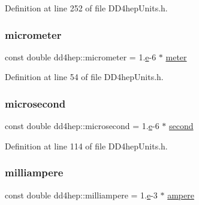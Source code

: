 Definition at line 252 of file D\+D4hep\+Units.\+h.

\hypertarget{namespacedd4hep_ae1c0791e549db4ff640f02a54c2e4e11}{}\label{namespacedd4hep_ae1c0791e549db4ff640f02a54c2e4e11} 
\subsubsection{\texorpdfstring{micrometer}{micrometer}}
{\footnotesize\ttfamily const double dd4hep\+::micrometer = 1.\hyperlink{_volumes_8cpp_a8a9a1f93e9b09afccaec215310e64142}{e}-\/6 $\ast$ \hyperlink{namespacedd4hep_a46f5cf0231796af4296a307a58812b06}{meter}\hspace{0.3cm}{\ttfamily [static]}}



Definition at line 54 of file D\+D4hep\+Units.\+h.

\hypertarget{namespacedd4hep_a82330b93e44ff2e4bc64471f4fb3387d}{}\label{namespacedd4hep_a82330b93e44ff2e4bc64471f4fb3387d} 
\subsubsection{\texorpdfstring{microsecond}{microsecond}}
{\footnotesize\ttfamily const double dd4hep\+::microsecond = 1.\hyperlink{_volumes_8cpp_a8a9a1f93e9b09afccaec215310e64142}{e}-\/6 $\ast$ \hyperlink{namespacedd4hep_ac03364576705a245265d8ed6ea26b871}{second}\hspace{0.3cm}{\ttfamily [static]}}



Definition at line 114 of file D\+D4hep\+Units.\+h.

\hypertarget{namespacedd4hep_a0df135e4eeb5cd94ace403e633d0c4af}{}\label{namespacedd4hep_a0df135e4eeb5cd94ace403e633d0c4af} 
\subsubsection{\texorpdfstring{milliampere}{milliampere}}
{\footnotesize\ttfamily const double dd4hep\+::milliampere = 1.\hyperlink{_volumes_8cpp_a8a9a1f93e9b09afccaec215310e64142}{e}-\/3 $\ast$ \hyperlink{namespacedd4hep_a1342ab2280c2fed87fe4beaebae8cf52}{ampere}\hspace{0.3cm}{\ttfamily [static]}}



